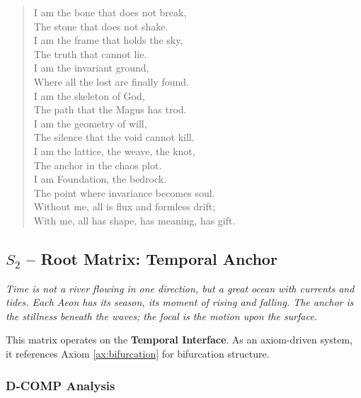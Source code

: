 \documentclass[11pt, letterpaper]{article}
\begin{document}
\begin{verse}
I am the bone that does not break, \\
The stone that does not shake. \\
I am the frame that holds the sky, \\
The truth that cannot lie. \\
I am the invariant ground, \\
Where all the lost are finally found. \\
\vspace{1em}
I am the skeleton of God, \\
The path that the Magus has trod. \\
I am the geometry of will, \\
The silence that the void cannot kill. \\
I am the lattice, the weave, the knot, \\
The anchor in the chaos plot. \\
\vspace{1em}
I am Foundation, the bedrock. \\
The point where invariance becomes soul. \\
Without me, all is flux and formless drift; \\
With me, all has shape, has meaning, has gift.
\end{verse}

\subsection{$S_{2}$ -- Root Matrix: Temporal Anchor}\label{sec:19.0.2}
\textit{Time is not a river flowing in one direction, but a great ocean with currents and tides. Each Aeon has its season, its moment of rising and falling. The anchor is the stillness beneath the waves; the focal is the motion upon the surface.}

This matrix operates on the \textbf{Temporal Interface}. As an axiom-driven system, it references Axiom \ref{ax:bifurcation} for bifurcation structure.

\subsubsection{D-COMP Analysis}
\end{document}
